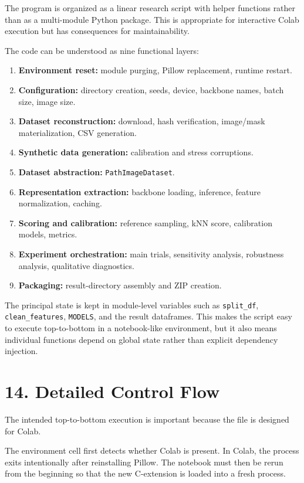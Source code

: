 \documentclass[
  11pt,
]{article}
\providecommand{\tightlist}{%
  \setlength{\itemsep}{0pt}\setlength{\parskip}{0pt}}
\begin{document}
The program is organized as a linear research script with helper
functions rather than as a multi-module Python package. This is
appropriate for interactive Colab execution but has consequences for
maintainability.

The code can be understood as nine functional layers:

\begin{enumerate}
\def\labelenumi{\arabic{enumi}.}
\tightlist
\item
  \textbf{Environment reset:} module purging, Pillow replacement,
  runtime restart.
\item
  \textbf{Configuration:} directory creation, seeds, device, backbone
  names, batch size, image size.
\item
  \textbf{Dataset reconstruction:} download, hash verification,
  image/mask materialization, CSV generation.
\item
  \textbf{Synthetic data generation:} calibration and stress
  corruptions.
\item
  \textbf{Dataset abstraction:} \texttt{PathImageDataset}.
\item
  \textbf{Representation extraction:} backbone loading, inference,
  feature normalization, caching.
\item
  \textbf{Scoring and calibration:} reference sampling, kNN score,
  calibration models, metrics.
\item
  \textbf{Experiment orchestration:} main trials, sensitivity analysis,
  robustness analysis, qualitative diagnostics.
\item
  \textbf{Packaging:} result-directory assembly and ZIP creation.
\end{enumerate}

The principal state is kept in module-level variables such as
\texttt{split\_df}, \texttt{clean\_features}, \texttt{MODELS}, and the
result dataframes. This makes the script easy to execute top-to-bottom
in a notebook-like environment, but it also means individual functions
depend on global state rather than explicit dependency injection.

\section{14. Detailed Control Flow}\label{detailed-control-flow}

The intended top-to-bottom execution is important because the file is
designed for Colab.

The environment cell first detects whether Colab is present. In Colab,
the process exits intentionally after reinstalling Pillow. The notebook
must then be rerun from the beginning so that the new C-extension is
loaded into a fresh process.
\end{document}
